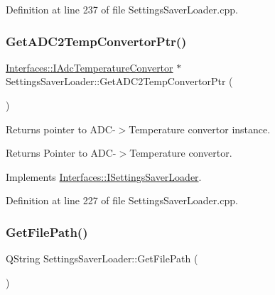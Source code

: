 Definition at line 237 of file Settings\+Saver\+Loader.\+cpp.

\mbox{\label{class_settings_saver_loader_aa1265b1e9431bf3b611e5b45b4782700}} 
\subsubsection{\texorpdfstring{Get\+A\+D\+C2\+Temp\+Convertor\+Ptr()}{GetADC2TempConvertorPtr()}}
{\footnotesize\ttfamily \hyperlink{class_interfaces_1_1_i_adc_temperature_convertor}{Interfaces\+::\+I\+Adc\+Temperature\+Convertor} $\ast$ Settings\+Saver\+Loader\+::\+Get\+A\+D\+C2\+Temp\+Convertor\+Ptr (\begin{DoxyParamCaption}{ }\end{DoxyParamCaption})\hspace{0.3cm}{\ttfamily [virtual]}}



Returns pointer to A\+D\+C-\/$>$Temperature convertor instance. 

\begin{DoxyReturn}{Returns}
Pointer to A\+D\+C-\/$>$Temperature convertor. 
\end{DoxyReturn}


Implements \hyperlink{class_interfaces_1_1_i_settings_saver_loader_a44d68d2bc7de1717bc41ee264db13ac5}{Interfaces\+::\+I\+Settings\+Saver\+Loader}.



Definition at line 227 of file Settings\+Saver\+Loader.\+cpp.

\mbox{\label{class_settings_saver_loader_a006a6350a00ffc18ec544616e504ccf7}} 
\subsubsection{\texorpdfstring{Get\+File\+Path()}{GetFilePath()}}
{\footnotesize\ttfamily Q\+String Settings\+Saver\+Loader\+::\+Get\+File\+Path (\begin{DoxyParamCaption}{ }\end{DoxyParamCaption})\hspace{0.3cm}{\ttfamily [virtual]}}




